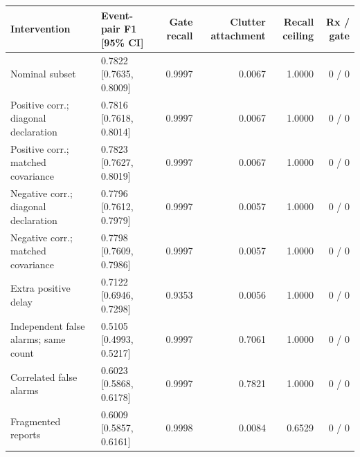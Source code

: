 \begin{tabularx}{\linewidth}{@{}YYrrrr@{}}\toprule
Intervention & Event-pair F1 [95\% CI] & Gate recall & Clutter attachment & Recall ceiling & Rx / gate \\\midrule
Nominal subset & 0.7822 [0.7635, 0.8009] & 0.9997 & 0.0067 & 1.0000 & 0 / 0 \\
Positive corr.; diagonal declaration & 0.7816 [0.7618, 0.8014] & 0.9997 & 0.0067 & 1.0000 & 0 / 0 \\
Positive corr.; matched covariance & 0.7823 [0.7627, 0.8019] & 0.9997 & 0.0067 & 1.0000 & 0 / 0 \\
Negative corr.; diagonal declaration & 0.7796 [0.7612, 0.7979] & 0.9997 & 0.0057 & 1.0000 & 0 / 0 \\
Negative corr.; matched covariance & 0.7798 [0.7609, 0.7986] & 0.9997 & 0.0057 & 1.0000 & 0 / 0 \\
Extra positive delay & 0.7122 [0.6946, 0.7298] & 0.9353 & 0.0056 & 1.0000 & 0 / 0 \\
Independent false alarms; same count & 0.5105 [0.4993, 0.5217] & 0.9997 & 0.7061 & 1.0000 & 0 / 0 \\
Correlated false alarms & 0.6023 [0.5868, 0.6178] & 0.9997 & 0.7821 & 1.0000 & 0 / 0 \\
Fragmented reports & 0.6009 [0.5857, 0.6161] & 0.9998 & 0.0084 & 0.6529 & 0 / 0 \\
\bottomrule\end{tabularx}

